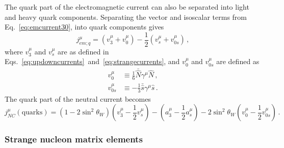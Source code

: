     The quark part of the electromagnetic current can also be separated into
    light and heavy quark components. Separating the vector and isoscalar terms
    from Eq.~\ref{eq:emcurrent30}, into quark components gives
    \begin{equation}
      j^{\mu}_{em;q} = (v^{\mu}_3 + v^{\mu}_0) - \frac{1}{2}(v^{\mu}_s + v^{\mu}_{0s}) \,,
    \end{equation}
    where $v^{\mu}_3$ and $v^{\mu}_s$ are as defined in
    Eqs.~\ref{eq:updowncurrents}~and~\ref{eq:strangecurrents}, and $v^{\mu}_0$
    and $v^{\mu}_{0s}$ are defined as
    \begin{equation}
      \begin{aligned}
        v^{\mu}_0 &\equiv \frac{1}{6}\bar{\hat{N}}\gamma^{\mu}\hat{N} \,, \\
        v^{\mu}_{0s} &\equiv -\frac{1}{3}\bar{\hat{s}}\gamma^{\mu}\hat{s} \,.
      \end{aligned}
    \end{equation}
    The quark part of the neutral current becomes
    \begin{equation}
      j^{\mu}_{NC}(\textrm{quarks}) = (1-2\sin^2\theta_W)(v^{\mu}_3 - \frac{1}{2}v^{\mu}_s)
                                    - (a^{\mu}_3 - \frac{1}{2}a^{\mu}_s)
                                    - 2\sin^2\theta_W(v^{\mu}_0 - \frac{1}{2}v^{\mu}_{0s}) \,.
    \end{equation}

  \subsubsection{Strange nucleon matrix elements}

